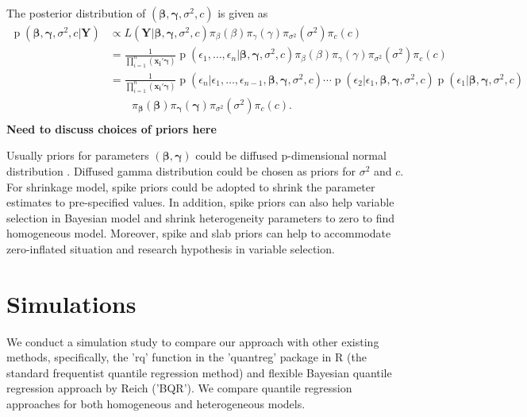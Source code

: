 \documentclass[12pt]{article}
\DeclareMathOperator{\pr}{p}
\begin{document}
The posterior distribution of $(\bm{\beta},
\bm{\gamma}, \sigma^2, c)$ is given as
\begin{align*}
  \pr(\bm{\beta}, \bm{\gamma}, \sigma^2, c|\bm{Y}) & \propto L(\bm{Y}|
  \bm{\beta}, \bm{\gamma}, \sigma^2, c) \pi_{\beta}(\beta)
  \pi_{\gamma}(\gamma) \pi_{\sigma^2}(\sigma^2) \pi_c(c) \\
  & = \frac{1}{\prod_{i=1}^n (\bm{x_i'\gamma})} \pr \left( \epsilon_1,
    \ldots, \epsilon_n | \bm{\beta}, \bm{\gamma}, \sigma^2, c\right)
  \pi_{\beta}(\beta)
  \pi_{\gamma}(\gamma) \pi_{\sigma^2}(\sigma^2) \pi_c(c) \\
  & = \frac{1}{\prod_{i=1}^n (\bm{x_i'\gamma})} \pr \left(\epsilon_n| \epsilon_1,
    \ldots, \epsilon_{n-1} , \bm{\beta}, \bm{\gamma}, \sigma^2, c\right)
  \cdots  \pr \left(\epsilon_2| \epsilon_1, \bm{\beta}, \bm{\gamma},
    \sigma^2, c\right)  \pr \left(\epsilon_1| \bm{\beta}, \bm{\gamma},
    \sigma^2, c\right)\\
  & \qquad 
  \pi_{\bm{\beta}}(\bm{\beta})
  \pi_{\bm{\gamma}}(\bm{\gamma}) \pi_{\sigma^2}(\sigma^2) \pi_c(c) .\\
\end{align*}
{\bf Need to discuss choices of priors here}

Usually priors for parameters $(\bm{\beta}, \bm{\gamma})$
could be diffused p-dimensional normal distribution . Diffused gamma
distribution could be chosen as priors for $\sigma^2$ and $c$. For
shrinkage model, spike priors could be adopted to shrink the parameter
estimates to pre-specified values. In addition, spike priors can also
help variable selection in Bayesian model and shrink heterogeneity
parameters to zero to find homogeneous model. Moreover, spike and slab
priors can help to accommodate zero-inflated situation and research
hypothesis in variable selection. 

\section{Simulations}
We
conduct a simulation study to compare our approach with other existing
methods, specifically, the 'rq' function in the 'quantreg' package in
R 
(the standard frequentist quantile regression method) and 
flexible Bayesian quantile regression approach by Reich
('BQR'). 
We compare quantile regression approaches
for both homogeneous and heterogeneous models. 
\end{document}

